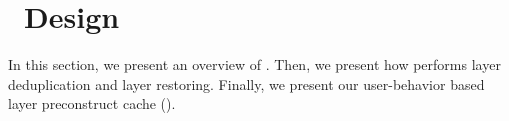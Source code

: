 \section{\sysname~Design}
\label{sec:Sift}

%



In this section, we present an overview of \sysname.
Then, we present how \sysname performs layer deduplication and layer restoring. 
Finally, we present our user-behavior based layer preconstruct cache (\preconstructcachename).





